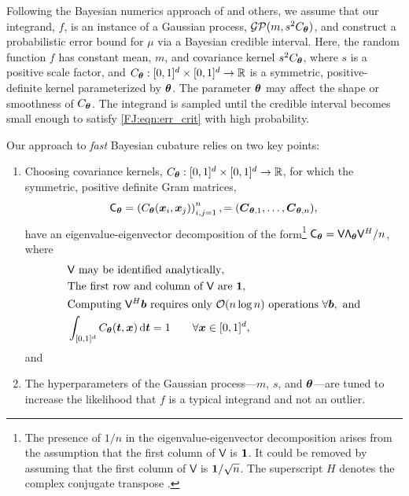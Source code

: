 \documentclass[graybox,footinfo]{svmult}
\begin{document}
Following the Bayesian numerics approach of \cite{BriEtal18a, Dia88a, OHa91a, RasGha03a} and others, we assume that our integrand, $f$, is an instance of a Gaussian process, $\mathcal{GP}(m,s^2 C_{\boldsymbol{\theta}})$, and construct a probabilistic error bound for $\mu$ via a Bayesian credible interval. 
Here, the random function $f$ has constant mean, $m$, and covariance kernel $s^2C_{\boldsymbol{\theta}}$, where $s$ is a positive scale factor, and $C_{\boldsymbol{\theta}}: [0,1]^d \times [0,1]^d \to \mathbb{R} $ is a symmetric, positive-definite kernel parameterized by ${\boldsymbol{\theta}}$.   The parameter ${\boldsymbol{\theta}}$ may affect the shape or smoothness of $C_{\boldsymbol{\theta}}$.  
The integrand is sampled until the credible interval becomes small enough to satisfy \eqref{FJ:eqn:err_crit} with high probability.  

Our approach to \emph{fast} Bayesian cubature \cite{RatHic19a} relies on two key points:
\begin{enumerate}
\renewcommand{\labelenumi}{\roman{enumi})}
    \item Choosing covariance kernels, $C_{\boldsymbol{\theta}}:[0,1]^d \times [0,1]^d \to {\mathbb{R}}$, for which the symmetric, positive definite Gram matrices, 
    \begin{equation} \label{FJ:eq:Gram}
        \mathsf{C}_\bstheta = \left(  C_\bstheta(\bsx_i,\bsx_j)  \right)_{i,j=1}^n, = (\bsC_{\bstheta,1}, \ldots, \bsC_{\bstheta,n}),
    \end{equation}
    have an eigenvalue-eigenvector decomposition of the form\footnote{The presence of $1/n$ in the eigenvalue-eigenvector decomposition arises from the assumption that the first column of $\mathsf{V}$ is ${\boldsymbol{1}}$.  It could be removed by assuming that the first column of $\mathsf{V}$ is ${\boldsymbol{1}}/\sqrt{n}$.  The superscript $H$ denotes the complex conjugate transpose \cite{Ber09a}.} \;$\mathsf{C}_{\boldsymbol{\theta}} = \mathsf{V} \mathsf{\Lambda}_{\boldsymbol{\theta}} \mathsf{V}^H/n$, where
    \begin{subequations} \label{FJ:eq:fastcompAssump}
	\begin{align}
	\label{FJ:eq:fastcompAssumpA}
	& \mathsf{V} \text{ may be identified analytically}, \\
	\label{FJ:eq:fastcompAssumpB}
	&\text{The first row and column of $\mathsf{V}$ are } \bsone, \\
	\label{FJ:eq:fastcompAssumpC}
	& \text{Computing $\mathsf{V}^H \bsb$ requires only $\calO(n \log n)$ operations } \forall \bsb, \text{ and} \\
	\label{FJ:addAssump}
    & \int_{[0,1]^d} C_\bstheta(\bst,\bsx) \, \D \bst = 1 \qquad \forall \bsx \in [0,1]^d,
	\end{align}
\end{subequations}
and
\item The hyperparameters of the Gaussian process---$m$, $s$, and ${\boldsymbol{\theta}}$---are tuned to increase the likelihood that $f$ is a typical integrand and not an outlier.
\end{enumerate}
\end{document}
